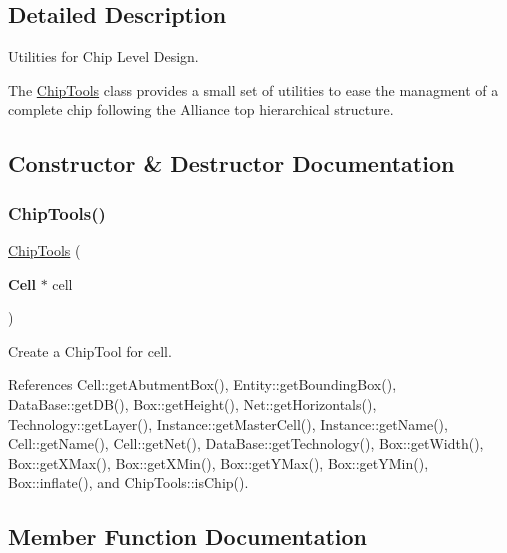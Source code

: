\subsection{Detailed Description}
Utilities for Chip Level Design. 

The \mbox{\hyperlink{classKatabatic_1_1ChipTools}{Chip\+Tools}} class provides a small set of utilities to ease the managment of a complete chip following the Alliance top hierarchical structure. 

\subsection{Constructor \& Destructor Documentation}
\mbox{\label{classKatabatic_1_1ChipTools_a5296f5ccb380869255d774b70e237686}} 
\subsubsection{\texorpdfstring{Chip\+Tools()}{ChipTools()}}
{\footnotesize\ttfamily \mbox{\hyperlink{classKatabatic_1_1ChipTools}{Chip\+Tools}} (\begin{DoxyParamCaption}\item[{\textbf{ Cell} $\ast$}]{cell }\end{DoxyParamCaption})}

Create a Chip\+Tool for {\ttfamily cell}. 

References Cell\+::get\+Abutment\+Box(), Entity\+::get\+Bounding\+Box(), Data\+Base\+::get\+D\+B(), Box\+::get\+Height(), Net\+::get\+Horizontals(), Technology\+::get\+Layer(), Instance\+::get\+Master\+Cell(), Instance\+::get\+Name(), Cell\+::get\+Name(), Cell\+::get\+Net(), Data\+Base\+::get\+Technology(), Box\+::get\+Width(), Box\+::get\+X\+Max(), Box\+::get\+X\+Min(), Box\+::get\+Y\+Max(), Box\+::get\+Y\+Min(), Box\+::inflate(), and Chip\+Tools\+::is\+Chip().



\subsection{Member Function Documentation}
\mbox{\label{classKatabatic_1_1ChipTools_ab6b7bc2b47ead460ac00a531451dc9cf}} 
